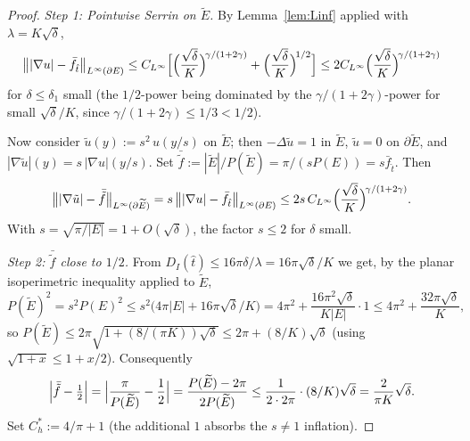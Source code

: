 \documentclass[11pt]{amsart}
\newcommand{\Etil}{\widetilde E}
\begin{document}
\begin{proof}
\emph{Step 1: Pointwise Serrin on $\Etil$.}
By Lemma~\ref{lem:Linf} applied with $\lambda=K\sqrt\delta$,
\[
   \bigl\||\nabla u|-\bar f_{\hat t}\bigr\|_{L^\infty(\partial E)}
      \le
   C_{L^\infty}\Bigl[
      \Bigl(\frac{\sqrt\delta}{K}\Bigr)^{\!\gamma/(1+2\gamma)}
      +\Bigl(\frac{\sqrt\delta}{K}\Bigr)^{\!1/2}
   \Bigr]
   \le
   2C_{L^\infty}\Bigl(\frac{\sqrt\delta}{K}\Bigr)^{\!\gamma/(1+2\gamma)}
\]
for $\delta\le\delta_1$ small (the $1/2$-power being dominated by the
$\gamma/(1+2\gamma)$-power for small $\sqrt\delta/K$, since
$\gamma/(1+2\gamma)\le 1/3<1/2$).

Now consider \(\tilde u(y):=s^2\,u(y/s)\) on \(\Etil\); then
\(-\Delta\tilde u=1\) in \(\Etil\), \(\tilde u=0\) on \(\partial\Etil\),
and \(|\nabla\tilde u|(y)=s\,|\nabla u|(y/s)\).  Set
\(\bar{\tilde f}:=|\Etil|/P(\Etil)=\pi/(sP(E))=s\bar f_{\hat t}\).
Then
\[
   \bigl\||\nabla\tilde u|-\bar{\tilde f}\bigr\|_{L^\infty
     (\partial\Etil)}
   =s\,\bigl\||\nabla u|-\bar f_{\hat t}\bigr\|
     _{L^\infty(\partial E)}
   \le 2s\,C_{L^\infty}\Bigl(\frac{\sqrt\delta}{K}\Bigr)^{\!\gamma/(1+2\gamma)}.
\]
With \(s=\sqrt{\pi/|E|}=1+O(\sqrt\delta)\), the factor \(s\le 2\) for
\(\delta\) small.

\emph{Step 2: \(\bar{\tilde f}\) close to \(1/2\).}  From
\(D_I(\hat t)\le 16\pi\delta/\lambda=16\pi\sqrt\delta/K\) we get, by
the planar isoperimetric inequality applied to \(\Etil\),
\[
   P(\Etil)^2=s^2P(E)^2\le s^2\bigl(4\pi|E|+16\pi\sqrt\delta/K\bigr)
      =4\pi^2+\frac{16\pi^2\sqrt\delta}{K|E|}\cdot 1
      \le 4\pi^2+\frac{32\pi\sqrt\delta}{K},
\]
so \(P(\Etil)\le 2\pi\sqrt{1+(8/(\pi K))\sqrt\delta}
\le 2\pi+(8/K)\sqrt\delta\) (using \(\sqrt{1+x}\le 1+x/2\)).
Consequently
\[
   \Bigl|\bar{\tilde f}-\tfrac12\Bigr|
   =\Bigl|\frac{\pi}{P(\Etil)}-\frac12\Bigr|
   =\frac{P(\Etil)-2\pi}{2P(\Etil)}
   \le\frac{1}{2\cdot 2\pi}\cdot(8/K)\sqrt\delta
   =\frac{2}{\pi K}\sqrt\delta.
\]
Set \(C_h^*:=4/\pi+1\) (the additional \(1\) absorbs the \(s\ne 1\)
inflation).


\end{proof}
\end{document}
